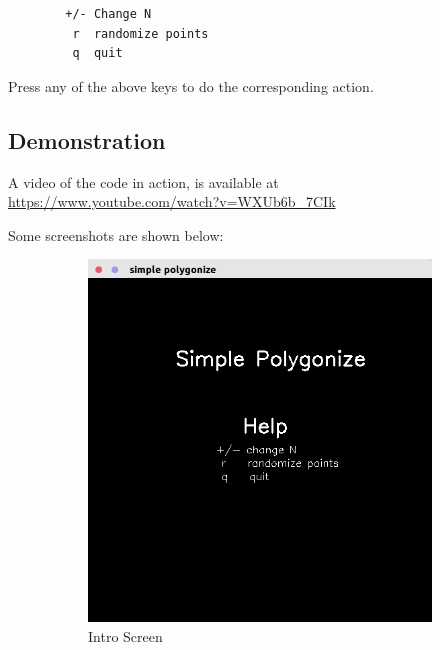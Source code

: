 \documentclass[a4paper, 12pt]{report}
\begin{document}
\begin{verbatim}
        +/- Change N
         r  randomize points
         q  quit
\end{verbatim}

Press any of the above keys to do the corresponding action.

\subsection*{Demonstration}

A video of the code in action, is available at \\ \href{https://www.youtube.com/watch?v=WXUb6b_7CIk}{https://www.youtube.com/watch?v=WXUb6b\_7CIk}

Some screenshots are shown below:


\begin{figure}[h]
    \centering
    \begin{subfigure}[t]{0.4\textwidth}
        \centering
        \includegraphics[width=\textwidth]{0-intro}
        \caption{Intro Screen}
    \end{subfigure}%
    ~
    \begin{subfigure}[t]{0.4\textwidth}
        \centering

\end{subfigure}
\end{figure}
\end{document}
